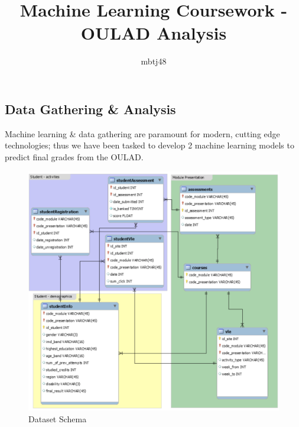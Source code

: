 \documentclass[11pt, a4paper]{article}
\title{\vspace{-1.25cm}Machine Learning Coursework - OULAD Analysis}
\author{mbtj48}
\date{}
\begin{document}
\maketitle
\begin{multicols}{2}

\section{Data Gathering \& Analysis}

Machine learning \& data gathering are paramount for modern, cutting edge technologies; thus we have been tasked to develop 2 machine learning models to predict final grades from the OULAD.

\begin{figure}[H]
	\includegraphics[width=\linewidth]{dataset.png} 
	\caption{Dataset Schema}
	\label{fig:schema}
\end{figure}


\end{multicols}
\end{document}
